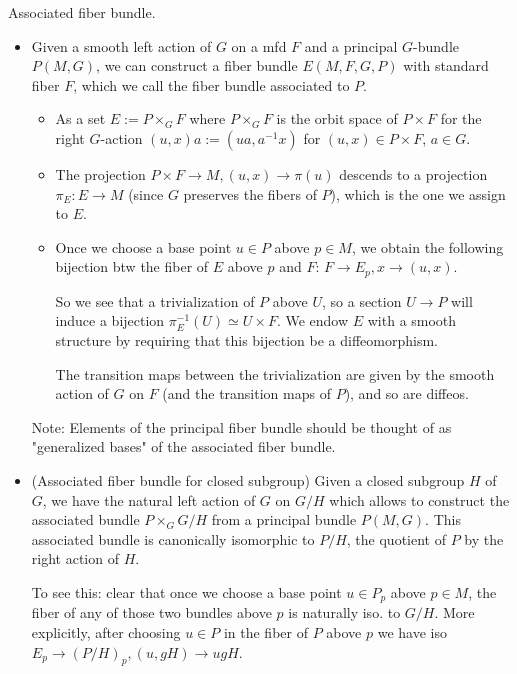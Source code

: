\documentclass{report}
\theoremstyle{definition}
\begin{document}
Associated fiber bundle.
\begin{itemize}
    \item Given a smooth left action of $G$ on a mfd $F$ and a principal $G$-bundle $P(M,G)$, we can construct a fiber bundle $E(M,F,G,P)$ with standard fiber $F$, which we call the fiber bundle associated to $P$.
    \begin{itemize}
        \item As a set $E:=P\times_GF$ where $P\times_GF$ is the orbit space of $P\times F$ for the right $G$-action $(u,x)a:=(ua,a^{-1}x)$ for $(u,x)\in P\times F$, $a\in G$.
        \item The projection $P\times F\to M,(u,x)\to\pi(u)$ descends to a projection $\pi_E:E\to M$ (since $G$ preserves the fibers of $P$), which is the one we assign to $E$.
        \item Once we choose a base point $u\in P$ above $p\in M$, we obtain the following bijection btw the fiber of $E$ above $p$ and $F$: $F\to E_p,x\to (u,x)$.

        So we see that a trivialization of $P$ above $U$, so a section $U\to P$ will induce a bijection $\pi_E^{-1}(U)\simeq U\times F$. We endow $E$ with a smooth structure by requiring that this bijection be a diffeomorphism.

        The transition maps between the trivialization are given by the smooth action of $G$ on $F$ (and the transition maps of $P$), and so are diffeos.
    \end{itemize}

    Note: Elements of the principal fiber bundle should be thought of as "generalized bases" of the associated fiber bundle.
    \item (Associated fiber bundle for closed subgroup) Given a closed subgroup $H$ of $G$, we have the natural left action of $G$ on $G/H$ which allows to construct the associated bundle $P\times_G G/H$ from a principal bundle $P(M,G)$. This associated bundle is canonically isomorphic to $P/H$, the quotient of $P$ by the right action of $H$.

    To see this: clear that once we choose a base point $u\in P_p$ above $p\in M$, the fiber of any of those two bundles above $p$ is naturally iso. to $G/H$. More explicitly, after choosing $u\in P$ in the fiber of $P$ above $p$ we have iso $E_p\to (P/H)_p,(u,gH)\to ugH$.
\end{itemize}
\end{document}
